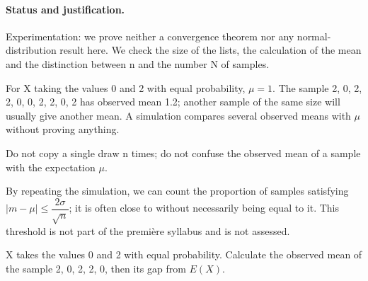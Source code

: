 \paragraph{Status and justification.} Experimentation: we prove neither a convergence theorem nor any normal-distribution result here. We check the size of the lists, the calculation of the mean and the distinction between n and the number N of samples.
\begin{example}For X taking the values 0 and 2 with equal probability, $\mu=1$. The sample 2, 0, 2, 2, 0, 0, 2, 2, 0, 2 has observed mean \num{1,2}; another sample of the same size will usually give another mean. A simulation compares several observed means with $\mu$ without proving anything.\end{example}\label{C08-EX5}
\begin{pitfall}Do not copy a single draw n times; do not confuse the observed mean of a sample with the expectation $\mu$.\end{pitfall}
\begin{beyond}By repeating the simulation, we can count the proportion of samples satisfying $|m-\mu|\leq \dfrac{2\sigma}{\sqrt n}$; it is often close to  without necessarily being equal to it. This threshold is not part of the première syllabus and is not assessed.\end{beyond}
\begin{application}X takes the values 0 and 2 with equal probability. Calculate the observed mean of the sample 2, 0, 2, 2, 0, then its gap from $E(X)$.\end{application}\label{C08-AP5}
\mxnewpage
